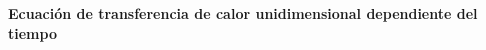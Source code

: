 \begin{center}
	\textbf{
		\textcolor{title}{\titulo \\ \name\\
			Ecuación de transferencia de calor unidimensional dependiente del tiempo}}
\end{center}
